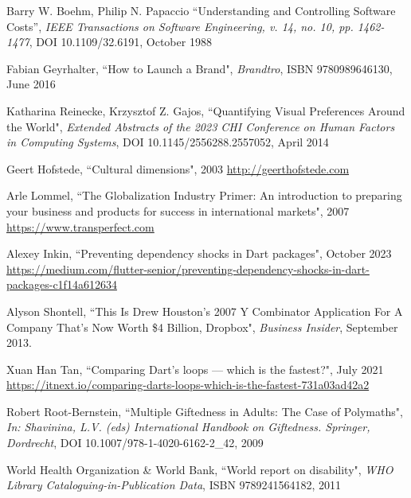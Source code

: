 \begin{thebibliography}{100}
 Barry W. Boehm, Philip N. Papaccio ``Understanding and Controlling Software Costs”,
\emph{IEEE Transactions on Software Engineering, v. 14, no. 10, pp. 1462-1477}, DOI 10.1109/32.6191, October 1988

 Fabian Geyrhalter, ``How to Launch a Brand", \emph{Brandtro}, ISBN 9780989646130, June 2016

 Katharina Reinecke, Krzysztof Z. Gajos, ``Quantifying Visual Preferences Around the World", 
\emph{Extended Abstracts of the 2023 CHI Conference on Human Factors in Computing Systems}, DOI 10.1145/2556288.2557052, 
April 2014

 Geert Hofstede, ``Cultural dimensions", 2003 \href{http://geerthofstede.com}{http://geerthofstede.com}

 Arle Lommel, ``The Globalization Industry Primer: An introduction to preparing your
business and products for success in international markets", 2007
\href{https://marketing.transperfect.com/acton/attachment/687/f-0f09/1/-/-/-/-/lisa_globalization_primer.pdf}{https://www.transperfect.com}

 Alexey Inkin, ``Preventing dependency shocks in Dart packages", October 2023
\href{https://medium.com/flutter-senior/preventing-dependency-shocks-in-dart-packages-c1f14a612634}{https://medium.com/flutter-senior/preventing-dependency-shocks-in-dart-packages-c1f14a612634}

 Alyson Shontell, ``This Is Drew Houston's 2007 Y Combinator Application For A Company 
That's Now Worth \$4 Billion, Dropbox", \emph{Business Insider}, September 2013.

 Xuan Han Tan, ``Comparing Dart’s loops — which is the fastest?", July 2021
\href{https://itnext.io/comparing-darts-loops-which-is-the-fastest-731a03ad42a2}{https://itnext.io/comparing-darts-loops-which-is-the-fastest-731a03ad42a2}

 Robert Root-Bernstein, ``Multiple Giftedness in Adults: The Case of Polymaths", 
\emph{In: Shavinina, L.V. (eds) International Handbook on Giftedness. Springer, Dordrecht}, 
DOI 10.1007/978-1-4020-6162-2\_42, 2009

 World Health Organization \& World Bank, ``World report on disability",
\emph{WHO Library Cataloguing-in-Publication Data}, ISBN 9789241564182, 2011


\end{thebibliography}
